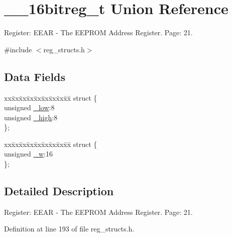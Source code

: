 \hypertarget{union____16bitreg__t}{\section{\+\_\+\+\_\+16bitreg\+\_\+t Union Reference}
\label{union____16bitreg__t}
}


Register\+: E\+E\+A\+R -\/ The E\+E\+P\+R\+O\+M Address Register. Page\+: 21.  




{\ttfamily \#include $<$reg\+\_\+structs.\+h$>$}

\subsection*{Data Fields}
\begin{DoxyCompactItemize}
\item 
\begin{tabbing}
xx\=xx\=xx\=xx\=xx\=xx\=xx\=xx\=xx\=\kill
struct \{\\
\>unsigned \hyperlink{union____16bitreg__t_a9be891e55b5143ae68b469bb8a6078cb}{\_low}:8\\
\>unsigned \hyperlink{union____16bitreg__t_a6a6132a8e0bb2790f3d7efcd7ee5b970}{\_high}:8\\
\}; \\

\end{tabbing}\item 
\begin{tabbing}
xx\=xx\=xx\=xx\=xx\=xx\=xx\=xx\=xx\=\kill
struct \{\\
\>unsigned \hyperlink{union____16bitreg__t_a9dbb4f0c94a03ccdb3ea488d6de97e23}{\_w}:16\\
\}; \\

\end{tabbing}\end{DoxyCompactItemize}


\subsection{Detailed Description}
Register\+: E\+E\+A\+R -\/ The E\+E\+P\+R\+O\+M Address Register. Page\+: 21. 

Definition at line 193 of file reg\+\_\+structs.\+h.



